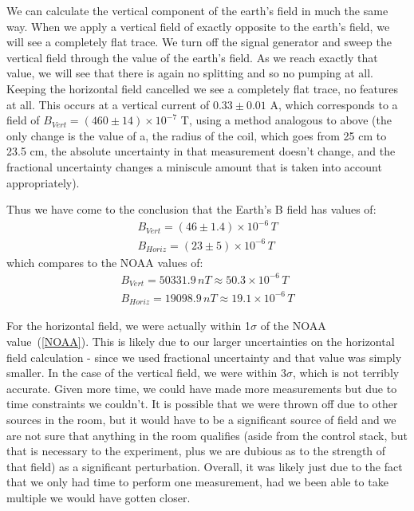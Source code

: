 \documentclass{article}
\begin{document}
    We can calculate the vertical component of the earth's field in much the same way.  When we apply a vertical field of exactly opposite to the earth's field, we will see a completely flat trace.  We turn off the signal generator and sweep the vertical field through the value of the earth's field.  As we reach exactly that value, we will see that there is again no splitting and so no pumping at all.  Keeping the horizontal field cancelled we see a completely flat trace, no features at all.  This occurs at a vertical current of $0.33 \pm 0.01$ A, which corresponds to a field of $B_{Vert} = (460 \pm 14) \times 10^{-7}$ T, using a method analogous to above (the only change is the value of a, the radius of the coil, which goes from 25 cm to 23.5 cm, the absolute uncertainty in that measurement doesn't change, and the fractional uncertainty changes a miniscule amount that is taken into account appropriately).

    \hspace{.25cm}

    Thus we have come to the conclusion that the Earth's B field has values of:
    \begin{gather*}
      B_{Vert} = (46 \pm 1.4) \times 10^{-6} \, T \\
      B_{Horiz} = (23 \pm 5) \times 10^{-6} \, T
    \end{gather*}
    which compares to the NOAA \cite{NOAA} values of:
    \begin{gather}
      B_{Vert} = 50331.9 \, nT \approx 50.3 \times 10^{-6} \, T \\
      B_{Horiz} = 19098.9 \, nT \approx 19.1 \times 10^{-6} \, T
      \label{NOAA}
    \end{gather}

    For the horizontal field, we were actually within 1$\sigma$ of the NOAA value~(\ref{NOAA}).  This is likely due to our larger uncertainties on the horizontal field calculation - since we used fractional uncertainty and that value was simply smaller.  In the case of the vertical field, we were within 3$\sigma$, which is not terribly accurate.  Given more time, we could have made more measurements but due to time constraints we couldn't.  It is possible that we were thrown off due to other sources in the room, but it would have to be a significant source of field and we are not sure that anything in the room qualifies (aside from the control stack, but that is necessary to the experiment, plus we are dubious as to the strength of that field) as a significant perturbation.  Overall, it was likely just due to the fact that we only had time to perform one measurement, had we been able to take multiple we would have gotten closer.
\end{document}
